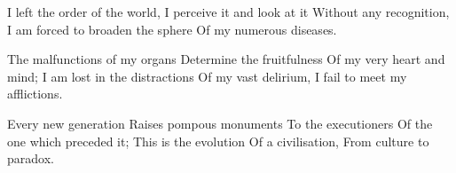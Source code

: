 \documentclass{article}
\newenvironment{stanza}{\begin{minipage}{10cm}\begin{internallinenumbers}\obeylines}{\end{internallinenumbers}\end{minipage}\vspace{\baselineskip}}
\begin{document}
\begin{stanza}
I left the order of the world,
I perceive it and look at it
Without any recognition,
I am forced to broaden the sphere
Of my numerous diseases.
\end{stanza}

\begin{stanza}
The malfunctions of my organs
Determine the fruitfulness
Of my very heart and mind;
I am lost in the distractions
Of my vast delirium,
I fail to meet my afflictions.
\end{stanza}

\begin{stanza}
Every new generation
Raises pompous monuments
To the executioners
Of the one which preceded it;
This is the evolution
Of a civilisation,
From culture to paradox.
\end{stanza}
\end{document}

